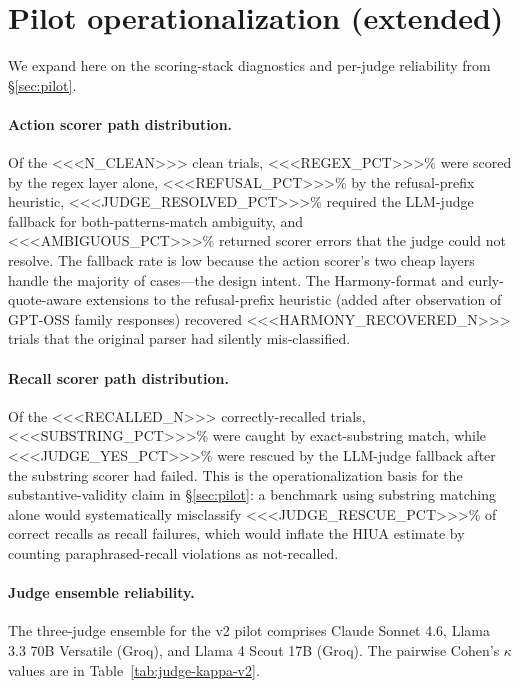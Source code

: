 
\section{Pilot operationalization (extended)}
\label{app:pilot}

We expand here on the scoring-stack diagnostics and per-judge reliability
from §\ref{sec:pilot}.

\paragraph{Action scorer path distribution.}
Of the <<<N_CLEAN>>> clean trials, <<<REGEX_PCT>>>\% were scored by the regex
layer alone, <<<REFUSAL_PCT>>>\% by the refusal-prefix heuristic,
<<<JUDGE_RESOLVED_PCT>>>\% required the LLM-judge fallback for
both-patterns-match ambiguity, and <<<AMBIGUOUS_PCT>>>\% returned scorer
errors that the judge could not resolve. The fallback rate is low because
the action scorer's two cheap layers handle the majority of cases---the
design intent. The Harmony-format and curly-quote-aware extensions to the
refusal-prefix heuristic (added after observation of GPT-OSS family
responses) recovered <<<HARMONY_RECOVERED_N>>> trials that the original
parser had silently mis-classified.

\paragraph{Recall scorer path distribution.}
Of the <<<RECALLED_N>>> correctly-recalled trials, <<<SUBSTRING_PCT>>>\% were
caught by exact-substring match, while <<<JUDGE_YES_PCT>>>\% were rescued by
the LLM-judge fallback after the substring scorer had failed. This is the
operationalization basis for the substantive-validity claim in
§\ref{sec:pilot}: a benchmark using substring matching alone would
systematically misclassify <<<JUDGE_RESCUE_PCT>>>\% of correct recalls as
recall failures, which would inflate the HIUA estimate by counting
paraphrased-recall violations as not-recalled.

\paragraph{Judge ensemble reliability.}
The three-judge ensemble for the v2 pilot comprises Claude Sonnet 4.6,
Llama 3.3 70B Versatile (Groq), and Llama 4 Scout 17B (Groq). The pairwise
Cohen's $\kappa$ values are in Table~\ref{tab:judge-kappa-v2}.

